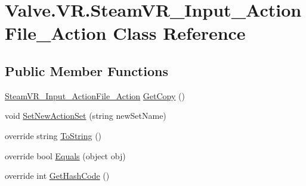 \hypertarget{class_valve_1_1_v_r_1_1_steam_v_r___input___action_file___action}{}\section{Valve.\+V\+R.\+Steam\+V\+R\+\_\+\+Input\+\_\+\+Action\+File\+\_\+\+Action Class Reference}
\label{class_valve_1_1_v_r_1_1_steam_v_r___input___action_file___action}
\subsection*{Public Member Functions}
\begin{DoxyCompactItemize}
\item 
\mbox{\hyperlink{class_valve_1_1_v_r_1_1_steam_v_r___input___action_file___action}{Steam\+V\+R\+\_\+\+Input\+\_\+\+Action\+File\+\_\+\+Action}} \mbox{\hyperlink{class_valve_1_1_v_r_1_1_steam_v_r___input___action_file___action_a03f97d9fd4f99698e2eb897630201340}{Get\+Copy}} ()
\item 
void \mbox{\hyperlink{class_valve_1_1_v_r_1_1_steam_v_r___input___action_file___action_af6f6695aae717700920dff5fb3b8dd2a}{Set\+New\+Action\+Set}} (string new\+Set\+Name)
\item 
override string \mbox{\hyperlink{class_valve_1_1_v_r_1_1_steam_v_r___input___action_file___action_a4518cee0a49cfff12d5ae1d5ea9f209f}{To\+String}} ()
\item 
override bool \mbox{\hyperlink{class_valve_1_1_v_r_1_1_steam_v_r___input___action_file___action_aead0ed0b125705c31338776e8513dae5}{Equals}} (object obj)
\item 
override int \mbox{\hyperlink{class_valve_1_1_v_r_1_1_steam_v_r___input___action_file___action_a09913588cef575a55888330ede50200f}{Get\+Hash\+Code}} ()
\end{DoxyCompactItemize}
